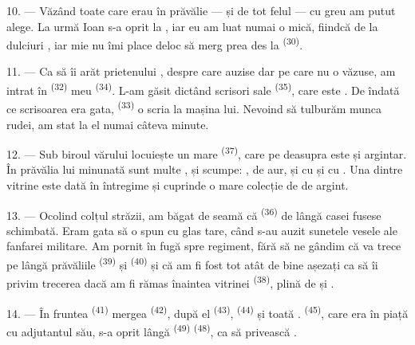 10. --- Văzând toate  care erau în prăvălie ---
 și  de tot felul --- cu
greu am putut alege. La urmă Ioan s-a oprit la , iar
eu am luat numai o  mică, fiindcă de la dulciuri
, iar mie nu îmi place deloc să merg prea des la
 \textsuperscript{(30)}.

\VUsaut{3.0mm}

11. --- Ca să îi arăt prietenului , despre care auzise dar
pe care nu o văzuse, am intrat în  \textsuperscript{(32)}
 meu \textsuperscript{(34)}. L-am găsit dictând scrisori
 sale \textsuperscript{(35)}, care este . De
îndată ce scrisoarea era gata,  \textsuperscript{(33)} o scria la
mașina lui. Nevoind să tulburăm munca rudei, am stat la el numai câteva minute.

12. --- Sub biroul vărului locuiește un mare 
\textsuperscript{(37)}, care pe deasupra este și argintar. În prăvălia lui minunată
sunt multe ,
 și  scumpe: ,
 de aur,  și  cu  și cu . Una dintre vitrine este dată în întregime
 și cuprinde o mare colecție de  de argint.

13. --- Ocolind colțul străzii, am băgat de seamă că 
\textsuperscript{(36)} de lângă  casei fusese schimbată. Eram gata
să o spun cu glas tare, când s-au auzit sunetele vesele ale fanfarei militare. Am
pornit în fugă spre regiment, fără să ne gândim că va trece pe lângă prăvăliile
 \textsuperscript{(39)} și 
\textsuperscript{(40)} și că am fi fost tot atât de bine așezați ca să îi privim
trecerea dacă am fi rămas înaintea vitrinei 
\textsuperscript{(38)}, plină de  și
.

\VUsaut{3.0mm}

14. --- În fruntea  \textsuperscript{(41)} mergea
 \textsuperscript{(42)}, după el 
\textsuperscript{(43)},  \textsuperscript{(44)} și toată
.  \textsuperscript{(45)}, care era în piață cu
adjutantul său, s-a oprit lângă  \textsuperscript{(49)}
 \textsuperscript{(48)}, ca să privească .

